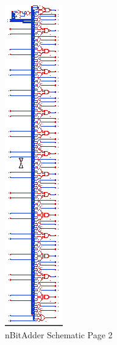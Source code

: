 \documentclass[11pt]{article}
\begin{document}
	
	\begin{figure}[H] 
		\centering 
		\includegraphics[width=0.7\linewidth]{"Pictures/nBitAdder Schematic Page 2"}
		\caption{nBitAdder Schematic Page 2} 
		\label{fig:nBitAdder-Schematic-Page-2} 
	\end{figure}
	
\end{document}
